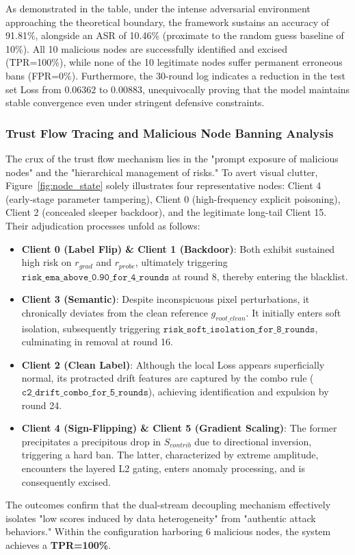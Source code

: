 \documentclass[11pt, a4paper]{article}
\begin{document}
As demonstrated in the table, under the intense adversarial environment approaching the theoretical boundary, the framework sustains an accuracy of 91.81\%, alongside an ASR of 10.46\% (proximate to the random guess baseline of 10\%). All 10 malicious nodes are successfully identified and excised (TPR=100\%), while none of the 10 legitimate nodes suffer permanent erroneous bans (FPR=0\%). Furthermore, the 30-round log indicates a reduction in the test set Loss from $0.06362$ to $0.00883$, unequivocally proving that the model maintains stable convergence even under stringent defensive constraints.

\subsubsection{Trust Flow Tracing and Malicious Node Banning Analysis}
The crux of the trust flow mechanism lies in the "prompt exposure of malicious nodes" and the "hierarchical management of risks." To avert visual clutter, Figure~\ref{fig:node_state} solely illustrates four representative nodes: Client 4 (early-stage parameter tampering), Client 0 (high-frequency explicit poisoning), Client 2 (concealed sleeper backdoor), and the legitimate long-tail Client 15. Their adjudication processes unfold as follows:
\begin{itemize}
    \item \textbf{Client 0 (Label Flip) \& Client 1 (Backdoor)}: Both exhibit sustained high risk on $r_{grad}$ and $r_{probe}$, ultimately triggering $\texttt{risk\_ema\_above\_0.90\_for\_4\_rounds}$ at round 8, thereby entering the blacklist.
    \item \textbf{Client 3 (Semantic)}: Despite inconspicuous pixel perturbations, it chronically deviates from the clean reference $g_{root\_clean}$. It initially enters soft isolation, subsequently triggering $\texttt{risk\_soft\_isolation\_for\_8\_rounds}$, culminating in removal at round 16.
    \item \textbf{Client 2 (Clean Label)}: Although the local Loss appears superficially normal, its protracted drift features are captured by the combo rule ($\texttt{c2\_drift\_combo\_for\_5\_rounds}$), achieving identification and expulsion by round 24.
    \item \textbf{Client 4 (Sign-Flipping) \& Client 5 (Gradient Scaling)}: The former precipitates a precipitous drop in $S_{contrib}$ due to directional inversion, triggering a hard ban. The latter, characterized by extreme amplitude, encounters the layered L2 gating, enters anomaly processing, and is consequently excised.
\end{itemize}
The outcomes confirm that the dual-stream decoupling mechanism effectively isolates "low scores induced by data heterogeneity" from "authentic attack behaviors." Within the configuration harboring 6 malicious nodes, the system achieves a \textbf{TPR=100\%}.
\end{document}
